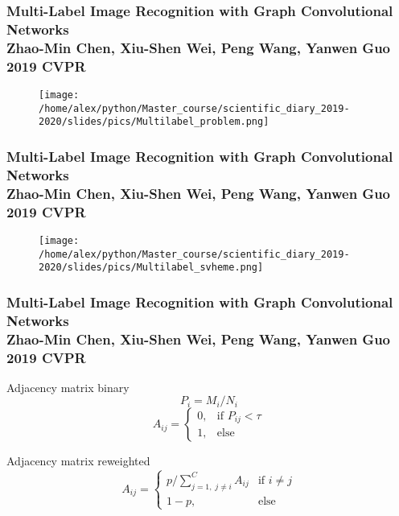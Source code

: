 \documentclass[fleqn, xcolor=x11names]{beamer}
\begin{document}
\begin{frame}\frametitle{\footnotesize{Multi-Label Image Recognition with Graph Convolutional Networks\\
Zhao-Min Chen, Xiu-Shen Wei, Peng Wang, Yanwen Guo 2019 CVPR
}}

\begin{figure}[h]
\begin{center}
\texttt{[image: /home/alex/python/Master\_course/scientific\_diary\_2019-2020/slides/pics/Multilabel\_problem.png]}
\end{center}
\end{figure}

\end{frame}

\begin{frame}\frametitle{\footnotesize{Multi-Label Image Recognition with Graph Convolutional Networks\\
Zhao-Min Chen, Xiu-Shen Wei, Peng Wang, Yanwen Guo 2019 CVPR
}}

\begin{figure}[h]
\begin{center}
\texttt{[image: /home/alex/python/Master\_course/scientific\_diary\_2019-2020/slides/pics/Multilabel\_svheme.png]}
\end{center}
\end{figure}

\end{frame}

\begin{frame}\frametitle{\footnotesize{Multi-Label Image Recognition with Graph Convolutional Networks\\
Zhao-Min Chen, Xiu-Shen Wei, Peng Wang, Yanwen Guo 2019 CVPR
}}

\begin{block}{Adjacency matrix binary}
$$ P_i = M_i/N_i $$
$$ A_{ij} = \begin{cases}0, &\mbox{if } P_{ij} < \tau \\
1, & \mbox{else} \end{cases}$$
\end{block}

\begin{block}{Adjacency matrix reweighted}
$$ A_{ij} = \begin{cases}p/\sum \limits_{j=1,\;j\neq i}^C A_{ij} &\mbox{if } i\neq j\\
1-p, & \mbox{else} \end{cases}$$
\end{block}

\end{frame}
\end{document}
